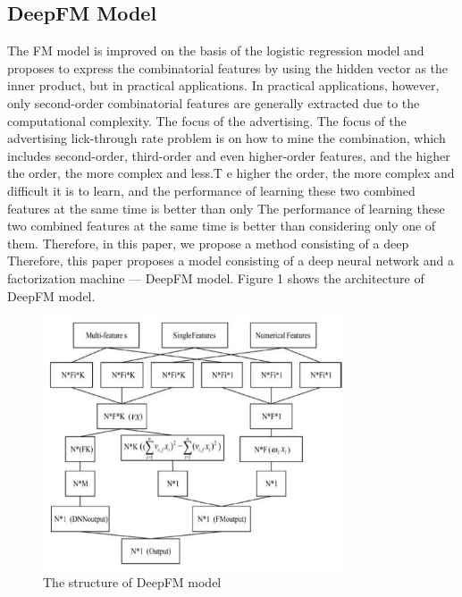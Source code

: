 \documentclass[11pt,en]{elegantpaper}
\begin{document}
\subsection{DeepFM Model}
The FM model is improved on the basis of the logistic regression model and proposes to express the combinatorial features by using the hidden vector as the inner product, but in practical applications. In practical applications, however, only second-order combinatorial features are generally extracted due to the computational complexity. The focus of the advertising. The focus of the advertising lick-through rate problem is on how to mine the combination, which includes second-order, third-order and even higher-order features, and the higher the order, the more complex and less.T e higher the order, the more complex and difficult it is to learn, and the performance of learning these two combined features at the same time is better than only
The performance of learning these two combined features at the same time is better than considering only one of them. Therefore, in this paper, we propose a method consisting of a deep
Therefore, this paper proposes a model consisting of a deep neural network and a factorization machine --- DeepFM model.
Figure 1 shows the architecture of DeepFM model.

\begin{figure}[h]
	\centering
	\includegraphics[width=0.8\textwidth]{./image/deepfm.png}
	\caption{The structure of DeepFM model}
	\label{deepfm}
\end{figure}
\end{document}
